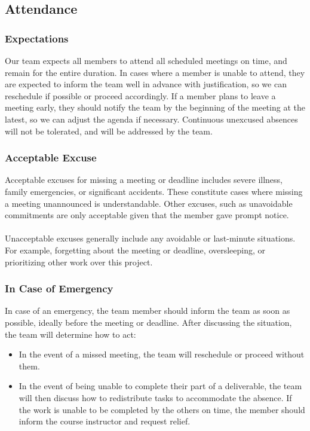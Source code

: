 \documentclass{article}
\begin{document}
\subsection*{Attendance}

\subsubsection*{Expectations}

Our team expects all members to attend all scheduled meetings on time, and remain for the entire duration. In cases where a member is unable to attend, they are expected to inform the team well in advance with justification, so we can reschedule if possible or proceed accordingly. If a member plans to leave a meeting early, they should notify the team by the beginning of the meeting at the latest, so we can adjust the agenda if necessary. Continuous unexcused absences will not be tolerated, and will be addressed by the team.

\subsubsection*{Acceptable Excuse}

Acceptable excuses for missing a meeting or deadline includes severe illness, family emergencies, or significant accidents. These constitute cases where missing a meeting unannounced is understandable. Other excuses, such as unavoidable commitments are only acceptable given that the member gave prompt notice. \\\\
Unacceptable excuses generally include any avoidable or last-minute situations. For example, forgetting about the meeting or deadline, oversleeping, or prioritizing other work over this project.

\subsubsection*{In Case of Emergency}

In case of an emergency, the team member should inform the team as soon as possible, ideally before the meeting or deadline. After discussing the situation, the team will determine how to act:
\begin{itemize}
  \item In the event of a missed meeting, the team will reschedule or proceed without them.
  \item In the event of being unable to complete their part of a deliverable, the team will then discuss how to redistribute tasks to accommodate the absence. If the work is unable to be completed by the others on time, the member should inform the course instructor and request relief.
\end{itemize}
\end{document}
